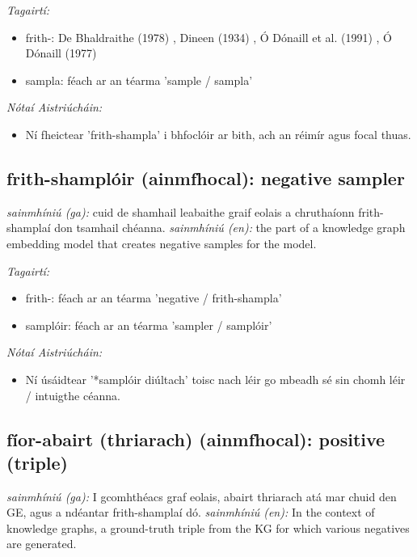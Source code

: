 \documentclass{article}
\begin{document}
 \noindent \textit{Tagairtí:}
\begin{itemize}
	\item frith-: De Bhaldraithe (1978) \cite{de-bhaldraithe}, Dineen (1934) \cite{dineen}, Ó Dónaill et al. (1991) \cite{focloir-beag}, Ó Dónaill (1977) \cite{odonaill}
	\item sampla: féach ar an téarma 'sample / sampla'
\end{itemize}

 \noindent \textit{Nótaí Aistriúcháin:}
\begin{itemize}
	\item Ní fheictear 'frith-shampla' i bhfoclóir ar bith, ach an réimír agus focal thuas.
\end{itemize}


\subsection*{frith-shamplóir (ainmfhocal): negative sampler} 
 \noindent \textit{sainmhíniú (ga):} cuid de shamhail leabaithe graif eolais a chruthaíonn frith-shamplaí don tsamhail chéanna.
\newline\newline
 \noindent \textit{sainmhíniú (en):} the part of a knowledge graph embedding model that creates negative samples for the model.
\newline

 \noindent \textit{Tagairtí:}
\begin{itemize}
	\item frith-: féach ar an téarma 'negative / frith-shampla'
	\item samplóir: féach ar an téarma 'sampler / samplóir'
\end{itemize}

 \noindent \textit{Nótaí Aistriúcháin:}
\begin{itemize}
	\item Ní úsáidtear '*samplóir diúltach' toisc nach léir go mbeadh sé sin chomh léir / intuigthe céanna.
\end{itemize}


\subsection*{fíor-abairt (thriarach) (ainmfhocal): positive (triple)} 
 \noindent \textit{sainmhíniú (ga):} I gcomhthéacs graf eolais, abairt thriarach atá mar chuid den GE, agus a ndéantar frith-shamplaí dó.
\newline\newline
 \noindent \textit{sainmhíniú (en):} In the context of knowledge graphs, a ground-truth triple from the KG for which various negatives are generated.
\newline
\end{document}
